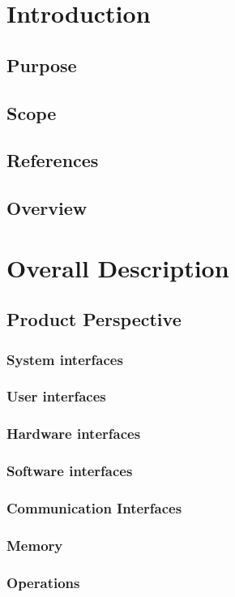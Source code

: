 \documentclass[a4paper,12pt]{article}
\begin{document}
\newpage
\section{Introduction}
\subsection{Purpose}
\subsection{Scope}
\subsection{References}
\subsection{Overview}

\section{Overall Description}
\subsection{Product Perspective}
\subsubsection{System interfaces}
\subsubsection{User interfaces}
\subsubsection{Hardware interfaces}
\subsubsection{Software interfaces}
\subsubsection{Communication Interfaces}
\subsubsection{Memory}
\subsubsection{Operations}
\end{document}
